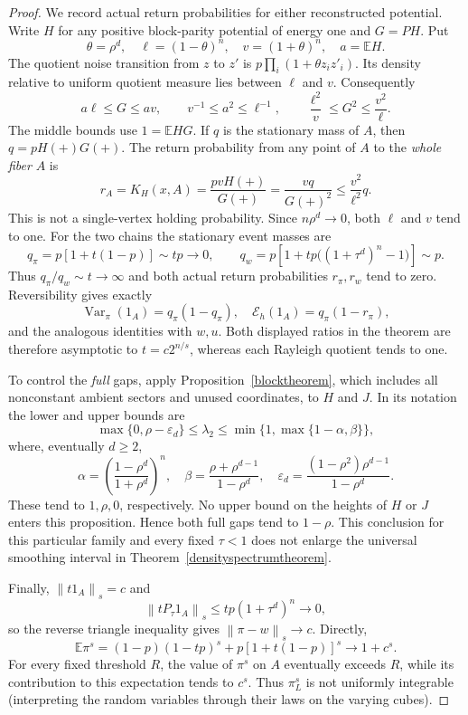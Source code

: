 \documentclass[11pt]{article}
\newcommand{\E}{\mathbb E}
\newcommand{\norm}[1]{\left\|#1\right\|}
\begin{document}
\begin{proof}
We record actual return probabilities for either reconstructed potential.
Write $H$ for any positive block-parity potential of energy one and
$G=PH$. Put
\[
 \theta=\rho^d,\quad \ell=(1-\theta)^n,\quad v=(1+\theta)^n,
 \quad a=\E H.
\]
The quotient noise transition from $z$ to $z'$ is
$p\prod_i(1+\theta z_i z'_i)$. Its density relative to uniform
quotient measure lies between $\ell$ and $v$. Consequently
\[
 a\ell\leq G\leq av,\qquad
 v^{-1}\leq a^2\leq\ell^{-1},\qquad
 \frac{\ell^2}{v}\leq G^2\leq\frac{v^2}{\ell}.
\]
The middle bounds use $1=\E HG$. If $q$ is the stationary mass of
$A$, then $q=pH(+)G(+)$. The return probability from any point of
$A$ to the \emph{whole fiber} $A$ is
\[
 r_A=K_H(x,A)=\frac{pvH(+)}{G(+)}
              =\frac{vq}{G(+)^2}\leq\frac{v^2}{\ell^2}q.
\]
This is not a single-vertex holding probability. Since $n\rho^d\to0$,
both $\ell$ and $v$ tend to one. For the two chains the stationary
event masses are
\[
 q_\pi=p[1+t(1-p)]\sim tp\longrightarrow0,\qquad
 q_w=p\left[1+tp\big((1+\tau^d)^n-1\big)\right]\sim p.
\]
Thus $q_\pi/q_w\sim t\to\infty$ and both actual return
probabilities $r_\pi,r_w$ tend to zero. Reversibility gives exactly
\[
 \operatorname{Var}_{\pi}(1_A)=q_\pi(1-q_\pi),\quad
 \mathcal E_h(1_A)=q_\pi(1-r_\pi),
\]
and the analogous identities with $w,u$. Both displayed ratios in the
theorem are therefore asymptotic to $t=c2^{n/s}$, whereas each
Rayleigh quotient tends to one.

To control the \emph{full} gaps, apply Proposition~\ref{blocktheorem},
which includes all nonconstant ambient sectors and unused coordinates,
to $H$ and $J$. In its notation the lower and upper bounds are
\[
 \max\{0,\rho-\varepsilon_d\}\leq\lambda_2
 \leq\min\{1,\max\{1-\alpha,\beta\}\},
\]
where, eventually $d\geq2$,
\[
 \alpha=\left(\frac{1-\rho^d}{1+\rho^d}\right)^n,\quad
 \beta=\frac{\rho+\rho^{d-1}}{1-\rho^d},\quad
 \varepsilon_d=\frac{(1-\rho^2)\rho^{d-1}}{1-\rho^d}.
\]
These tend to $1,\rho,0$, respectively. No upper bound on the
heights of $H$ or $J$ enters this proposition. Hence both full gaps
tend to $1-\rho$. This conclusion for this particular family and
every fixed $\tau<1$ does not enlarge the universal smoothing
interval in Theorem~\ref{densityspectrumtheorem}.

Finally, $\norm{t1_A}_s=c$ and
\[
 \norm{tP_\tau1_A}_s\leq tp(1+\tau^d)^n\longrightarrow0,
\]
so the reverse triangle inequality gives $\norm{\pi-w}_s\to c$.
Directly,
\[
 \E\pi^s=(1-p)(1-tp)^s+p[1+t(1-p)]^s\longrightarrow1+c^s.
\]
For every fixed threshold $R$, the value of $\pi^s$ on $A$ eventually
exceeds $R$, while its contribution to this expectation tends to $c^s$.
Thus $\pi_L^s$ is not uniformly integrable (interpreting the random
variables through their laws on the varying cubes).
\end{proof}
\end{document}
